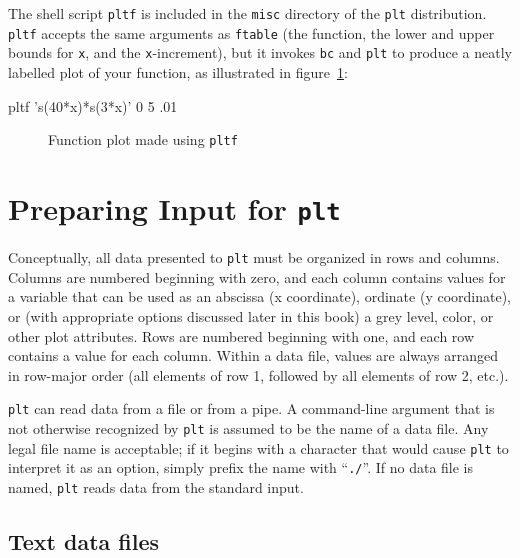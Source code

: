 \documentclass{book}
\begin{document}
%
%
The shell script {\tt pltf} is included in the {\tt misc} directory of
the {\tt plt} distribution.  {\tt pltf} accepts the same arguments as
{\tt ftable} (the function, the lower and upper bounds for {\tt x},
and the {\tt x}-increment), but it invokes {\tt bc} and {\tt plt} to produce
a neatly labelled plot of your function, as illustrated in
figure~\ref{fig:function}:

\begin{center}
\begin{boxedverbatim}
pltf 's(40*x)*s(3*x)' 0 5 .01
\end{boxedverbatim}
\end{center}

\begin{figure}
\begin{center}
\caption{Function plot made using {\tt pltf} \label{fig:function}}
\end{center}
\end{figure}

\chapter{Preparing Input for {\tt plt} \label{sec:data-prep}}

%
Conceptually, all data presented to {\tt plt} must be organized in
rows and columns.  Columns are numbered beginning with zero, and each
column contains values for a variable that can be used as an abscissa
(x coordinate), ordinate (y coordinate), or (with appropriate options
discussed later in this book) a grey level, color, or other plot
attributes.  Rows are numbered beginning with one, and each row
contains a value for each column.  Within a data file, values are
always arranged in row-major order (all elements of row 1, followed by
all elements of row 2, etc.).

%
{\tt plt} can read data from a file or from a pipe.  A command-line argument
that is not otherwise recognized by {\tt plt} is assumed to be the name of a
data file.  Any legal file name is acceptable; if it begins with a character
that would cause {\tt plt} to interpret it as an option, simply prefix the name
with ``{\tt ./}''.  If no data file is named, {\tt plt} reads data from the
standard input.

\section{Text data files}
\end{document}
